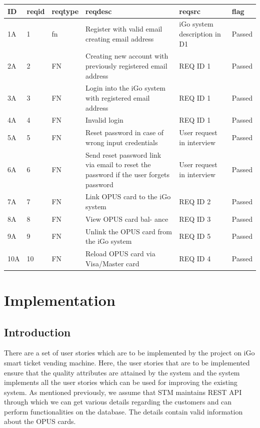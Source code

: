 \documentclass[11pt, english]{report}
\begin{document}
\vspace*{0.2in}
\setlength{\tabcolsep}{18pt}
\renewcommand{\arraystretch}{1.5}
\begin{longtable}{ |p{0.5cm}|p{0.5cm}|p{1cm}|p{4cm}|p{2.5cm}|p{1cm}| }
\hline
\textbf{ID} & \textbf{\gls{reqid}} & \textbf{\gls{reqtype}} & \textbf{\gls{reqdesc}} & \textbf{\gls{reqsrc}} & \textbf{\gls{flag}}\\
\hline
1A& 
1&
\gls{fn}& 
Register with valid email creating email address&
iGo system description in D1&
Passed
\\
\hline
2A&
2&
FN&
Creating new account with previously registered email address& 
REQ ID 1&
Passed\\
\hline
3A&
3&
FN&
Login into the iGo system with registered email address& 
REQ ID 1&
Passed\\
\hline
4A&
4&
FN&
Invalid login&
REQ ID 1&
Passed\\
\hline
5A&
5&
FN&
Reset password in case of wrong input credentials&
User request in interview&
Passed\\
\hline
6A&
6&
FN&
Send reset password link via email to reset the password if the user forgets password&
User request in interview&
Passed\\
\hline
7A&
7&
FN&
Link OPUS card to the iGo system&
REQ ID 2&
Passed\\
\hline
8A&
8&
FN&
View OPUS card bal- ance& 
REQ ID 3 &
Passed\\
\hline
9A&
9&
FN&
Unlink the OPUS card from the iGo system&
REQ ID 5 &
Passed\\
\hline
10A&
10&
FN&
Reload OPUS card via Visa/Master card& 
REQ ID 4 &
Passed\\
\hline
\end{longtable}


\chapter{Implementation}

\section{Introduction}


There are a set of user stories which are to be implemented by the project on iGo smart ticket vending machine. Here, the user stories that are to be implemented ensure that the quality attributes are attained by the system and the system implements all the user stories which can be used for improving the existing system. As mentioned previously, we assume that STM maintains REST API through which we can get various details regarding the customers and can perform functionalities on the database. The details contain valid information about the OPUS cards.\\
\end{document}
